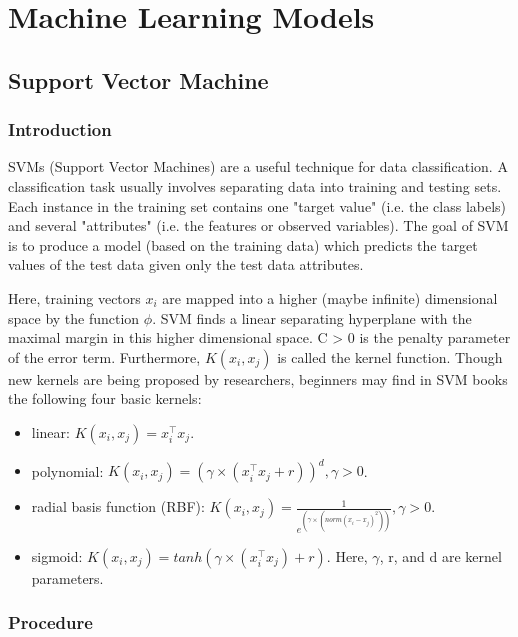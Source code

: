 \section{Machine Learning Models}
\vspace{-0.1in}

\subsection{Support Vector Machine}

\subsubsection{Introduction}
SVMs (Support Vector Machines) are a useful technique for data classification. A classification task usually involves separating data into training and testing sets. Each instance in the training set contains one "target value" (i.e. the class labels) and several "attributes" (i.e. the features or observed variables). The goal of SVM is to produce a model (based on the training data) which predicts the target values of the test data given only the test data attributes.

Here, training vectors $x_i$ are mapped into a higher (maybe infinite) dimensional space by the function $\phi$. SVM finds a linear separating hyperplane with the maximal margin in this higher dimensional space. C > 0 is the penalty parameter of the error term. Furthermore, $K(x_i ,x_j)$ is called the kernel function. Though new kernels are being proposed by researchers, beginners may find in SVM books the following four basic kernels:
\begin{itemize}

\item linear: $K(x_i , x_j) = x_i^\intercal x_j$.

\item polynomial: $K(x_i , x_j) = (\gamma\times(x_i^\intercal x_j+r))^d , \gamma > 0$.

\item radial basis function (RBF): $K(x_i,x_j) = \frac{1}{{e^(\gamma\times(norm(x_i-x_j)^2))}}, \gamma > 0$.

\item sigmoid: $K(x_i , x_j ) = tanh(\gamma\times(x_i^\intercal x_j) + r)$. Here, $\gamma$, r, and d are kernel parameters.
\end{itemize}

\subsubsection{Procedure}

